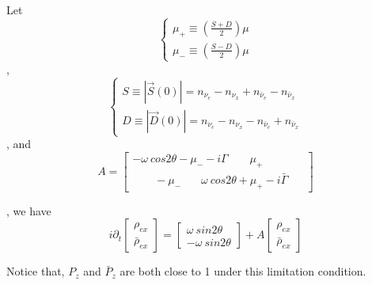 \documentclass[aps,prd,twocolumn,amsmath,amssymb,groupedaddress]{revtex4-2}
\begin{document}
Let
\begin{equation}
\begin{cases}
	\mu_+ \equiv \left(\frac{S+D}{2}\right) \mu
	\\
	\mu_- \equiv \left(\frac{S-D}{2}\right) \mu
\end{cases}
\end{equation}
, 
\begin{equation}
	\begin{cases}
		S \equiv |\vec{S}(0)| =  n_{\nu_e} - n_{\nu_x} + n_{\bar{\nu}_e} - n_{\bar{\nu}_x}
		\\
		D \equiv |\vec{D}(0)| =  n_{\nu_e} - n_{\nu_x} - n_{\bar{\nu}_e} + n_{\bar{\nu}_x}
	\end{cases}
\end{equation}, 
and
\begin{equation}
A = \begin{bmatrix}
	-\omega ~cos2\theta-\mu_--i\Gamma ~~~~~~~~~ \mu_+ ~~~~~~~~~~~~~~~~\\ ~~~~~~~~~ -\mu_- ~~~~~~~~ \omega ~cos2\theta+\mu_+-i\bar{\Gamma}
\end{bmatrix}
\end{equation}

, we have
\begin{equation}
	\label{equ:EOM_matrix}
	i \partial_t \begin{bmatrix}
		\rho_{ex} \\ \bar{\rho}_{ex}
	\end{bmatrix} =
	\begin{bmatrix}
		\omega ~sin2\theta \\ - \omega ~sin2\theta
	\end{bmatrix} + A \begin{bmatrix}
		\rho_{ex} \\ \bar{\rho}_{ex}
	\end{bmatrix}
\end{equation}

Notice that, $P_{z}$ and $\bar{P}_{z}$ are both close to 1 under this limitation condition.
\end{document}
